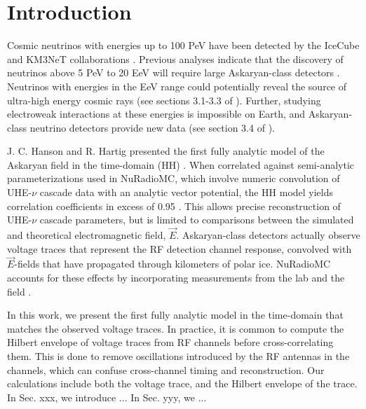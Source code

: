 \documentclass[amsmath,amssymb,aps,prd,10pt,twocolumn,showkeys]{revtex4}
\begin{document}
\section{Introduction}

Cosmic neutrinos with energies up to 100 PeV have been detected by the IceCube and KM3NeT collaborations \cite{10.1126/science.1242856,aartsen2013first-bff,collaboration2016observation-03b,collaboration2018neutrino-2a0,collaboration2021detection-6fa,collaboration2022evidence-a08,collaboration2023observation-08b,collaboration2025observation-22f}. Previous analyses indicate that the discovery of neutrinos above 5 PeV to 20 EeV will  require large Askaryan-class detectors \cite{10.1103/physrevd.98.062003}.  Neutrinos with energies in the EeV range could potentially reveal the source of ultra-high energy cosmic rays (see sections 3.1-3.3 of \cite{10.48550/arxiv.2008.04323}).  Further, studying electroweak interactions at these energies is impossible on Earth, and Askaryan-class neutrino detectors provide new data (see section 3.4 of \cite{10.48550/arxiv.2008.04323}).

J. C. Hanson and R. Hartig presented the first fully analytic model of the Askaryan field in the time-domain (HH) \cite{PhysRevD.105.123019}.  When correlated against semi-analytic parameterizations used in NuRadioMC, which involve numeric convolution of UHE-$\nu$ cascade data with an analytic vector potential, the HH model yields correlation coefficients in excess of 0.95 \cite{PhysRevD.105.123019}.  This allows precise reconstruction of UHE-$\nu$ cascade parameters, but is limited to comparisons between the simulated and theoretical electromagnetic field, $\vec{E}$.  Askaryan-class detectors actually observe voltage traces that represent the RF detection channel response, convolved with $\vec{E}$-fields that have propagated through kilometers of polar ice.  NuRadioMC accounts for these effects by incorporating measurements from the lab and the field \cite{10.1016/j.astropartphys.2014.09.002,10.3189/2015jog14j214,10.3189/2015jog15j057,saltzberg,10.1103/PhysRevD.74.043002,ask_ice,10.1140/epjc/s10052-020-7612-8,Barwick:2018497,ALLISON201963,10.1088/1748-0221/15/09/p09039,deaconu2018measurements-182,welling2024brief-b47}.

In this work, we present the first fully analytic model in the time-domain that matches the observed voltage traces.  In practice, it is common to compute the Hilbert envelope of voltage traces from RF channels before cross-correlating them.  This is done to remove oscillations introduced by the RF antennas in the channels, which can confuse cross-channel timing and reconstruction.  Our calculations include both the voltage trace, and the Hilbert envelope of the trace.  In Sec. xxx, we introduce ... In Sec. yyy, we ...
\end{document}
